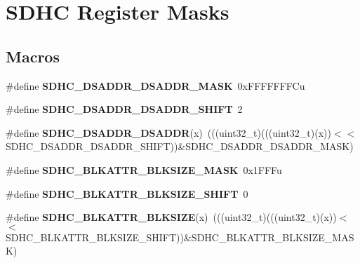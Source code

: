 \hypertarget{group__SDHC__Register__Masks}{}\section{S\+D\+HC Register Masks}
\label{group__SDHC__Register__Masks}
\subsection*{Macros}
\begin{DoxyCompactItemize}
\item 
\#define {\bfseries S\+D\+H\+C\+\_\+\+D\+S\+A\+D\+D\+R\+\_\+\+D\+S\+A\+D\+D\+R\+\_\+\+M\+A\+SK}~0x\+F\+F\+F\+F\+F\+F\+F\+Cu\hypertarget{group__SDHC__Register__Masks_ga0879039aa6d312f63642daf292ea07e1}{}\label{group__SDHC__Register__Masks_ga0879039aa6d312f63642daf292ea07e1}

\item 
\#define {\bfseries S\+D\+H\+C\+\_\+\+D\+S\+A\+D\+D\+R\+\_\+\+D\+S\+A\+D\+D\+R\+\_\+\+S\+H\+I\+FT}~2\hypertarget{group__SDHC__Register__Masks_gaab7280ffe17d17dc4e36a58270c97edb}{}\label{group__SDHC__Register__Masks_gaab7280ffe17d17dc4e36a58270c97edb}

\item 
\#define {\bfseries S\+D\+H\+C\+\_\+\+D\+S\+A\+D\+D\+R\+\_\+\+D\+S\+A\+D\+DR}(x)~(((uint32\+\_\+t)(((uint32\+\_\+t)(x))$<$$<$S\+D\+H\+C\+\_\+\+D\+S\+A\+D\+D\+R\+\_\+\+D\+S\+A\+D\+D\+R\+\_\+\+S\+H\+I\+FT))\&S\+D\+H\+C\+\_\+\+D\+S\+A\+D\+D\+R\+\_\+\+D\+S\+A\+D\+D\+R\+\_\+\+M\+A\+SK)\hypertarget{group__SDHC__Register__Masks_gaef12dcdcf7b6872221585294357d8bc4}{}\label{group__SDHC__Register__Masks_gaef12dcdcf7b6872221585294357d8bc4}

\item 
\#define {\bfseries S\+D\+H\+C\+\_\+\+B\+L\+K\+A\+T\+T\+R\+\_\+\+B\+L\+K\+S\+I\+Z\+E\+\_\+\+M\+A\+SK}~0x1\+F\+F\+Fu\hypertarget{group__SDHC__Register__Masks_ga15a1d67cd23b4eaae16cf10809520195}{}\label{group__SDHC__Register__Masks_ga15a1d67cd23b4eaae16cf10809520195}

\item 
\#define {\bfseries S\+D\+H\+C\+\_\+\+B\+L\+K\+A\+T\+T\+R\+\_\+\+B\+L\+K\+S\+I\+Z\+E\+\_\+\+S\+H\+I\+FT}~0\hypertarget{group__SDHC__Register__Masks_gab4dbeb59800b35d4f9e1d12f27a3f4d8}{}\label{group__SDHC__Register__Masks_gab4dbeb59800b35d4f9e1d12f27a3f4d8}

\item 
\#define {\bfseries S\+D\+H\+C\+\_\+\+B\+L\+K\+A\+T\+T\+R\+\_\+\+B\+L\+K\+S\+I\+ZE}(x)~(((uint32\+\_\+t)(((uint32\+\_\+t)(x))$<$$<$S\+D\+H\+C\+\_\+\+B\+L\+K\+A\+T\+T\+R\+\_\+\+B\+L\+K\+S\+I\+Z\+E\+\_\+\+S\+H\+I\+FT))\&S\+D\+H\+C\+\_\+\+B\+L\+K\+A\+T\+T\+R\+\_\+\+B\+L\+K\+S\+I\+Z\+E\+\_\+\+M\+A\+SK)\hypertarget{group__SDHC__Register__Masks_ga189a6c8c7269f3fce6679d2dc310c86b}{}\label{group__SDHC__Register__Masks_ga189a6c8c7269f3fce6679d2dc310c86b}


\end{DoxyCompactItemize}
